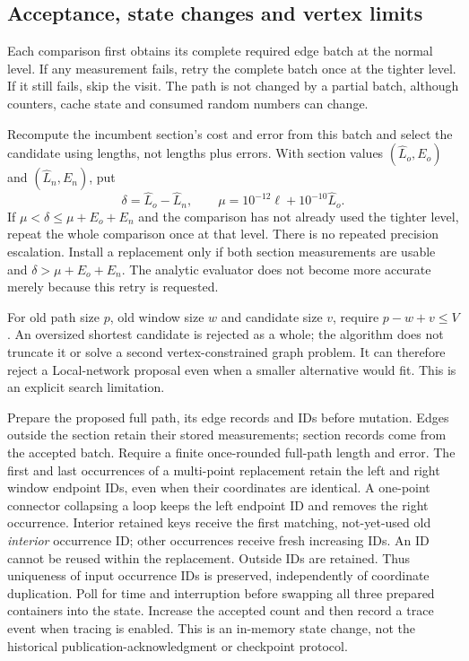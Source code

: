 \documentclass[11pt,letterpaper]{article}
\begin{document}
\subsection{Acceptance, state changes and vertex limits}
\label{sec:cpp-commit}

Each comparison first obtains its complete required edge batch at the normal
level. If any measurement fails, retry the complete batch once at the tighter
level. If it still fails, skip the visit. The path is not changed by a partial
batch, although counters, cache state and consumed random numbers can change.

Recompute the incumbent section's cost and error from this batch and select
the candidate using lengths, not lengths plus errors. With section values
$(\widehat L_o,E_o)$ and $(\widehat L_n,E_n)$, put
\[
 \delta=\widehat L_o-\widehat L_n,\qquad
 \mu=10^{-12}\ell+10^{-10}\widehat L_o.
\]
If $\mu<\delta\le\mu+E_o+E_n$ and the comparison has not already used the
tighter level, repeat the whole comparison once at that level. There is no
repeated precision escalation. Install a replacement only if both section
measurements are usable and $\delta>\mu+E_o+E_n$. The analytic evaluator
does not become more accurate merely because this retry is requested.

For old path size $p$, old window size $w$ and candidate size $v$, require
$p-w+v\le V$. An oversized shortest candidate is rejected as a whole; the
algorithm does not truncate it or solve a second vertex-constrained graph
problem. It can therefore reject a Local-network proposal even when a smaller
alternative would fit. This is an explicit search limitation.

Prepare the proposed full path, its edge records and IDs before mutation.
Edges outside the section retain their stored measurements; section records
come from the accepted batch. Require a finite once-rounded full-path length
and error. The first and last occurrences of a multi-point replacement
retain the left and right window endpoint IDs, even when their coordinates
are identical. A one-point connector collapsing a loop keeps the left
endpoint ID and removes the right occurrence. Interior retained keys receive
the first matching, not-yet-used old \emph{interior} occurrence ID; other
occurrences receive fresh increasing IDs. An ID cannot be reused within the
replacement. Outside IDs are retained. Thus uniqueness of input occurrence
IDs is preserved, independently of coordinate duplication. Poll for time
and interruption before swapping all three prepared
containers into the state. Increase the accepted count and then record a
trace event when tracing is enabled. This is an in-memory state change,
not the historical publication-acknowledgment or checkpoint protocol.
\end{document}
